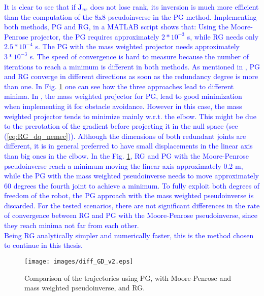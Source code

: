 \textcolor{blue}{It is clear to see that if $\mathbf{J}_{nr}$ does not lose rank, its inversion is much more efficient than the computation of the $\mathrm{8x8}$ pseudoinverse in the PG method. Implementing both methods, PG and RG, in a MATLAB script shows that: Using the Moore-Penrose projector, the PG  requires approximately $2*10^{-3}$ s, while RG  needs only $2.5*10^{-4}$ s. The PG with the mass weighted projector needs approximately $3*10^{-3}$ s. The speed of convergence is hard to measure because the number of iterations to reach a minimum is different in both methods.
As mentioned in \cite{reduced_gradient}, PG and RG converge in different directions as soon as the redundancy degree is more than one. In Fig. \ref{fig:diff_GD_v2} one can see how the three approaches lead to different minima.  In \cite{Nemec_2}, the mass weighted projector for PG, lead to good minimization when implementing it for obstacle avoidance.  
However in this case, the mass weighted projector tends to minimize mainly w.r.t. the elbow. This might be due to the prerotation of the gradient before projecting it in the null space (see (\ref{eq:RG_dq_nemec})). Although the dimensions of both redundant joints are different, it is in general preferred to have small displacements in the linear axis than big ones in the elbow. In the Fig. \ref{fig:diff_GD_v2}, RG and PG with the Moore-Penrose pseudoinverse reach a minimum moving the linear axis approximately 0.2 m, while the PG with the mass weighted pseudoinverse needs to move approximately 60 degrees the fourth joint to achieve a minimum. To fully exploit both degrees of freedom of the robot, the PG approach with the mass weighted pseudoinverse is discarded. 
 For the tested scenarios, there are not significant differences in the rate of convergence between RG and PG with the Moore-Penrose pseudoinverse, since they reach minima not far from each other.  \\ 
Being RG analytically simpler and numerically faster, this is the method chosen to continue in this thesis. }


\begin{figure}[!htb]
	\centerline{
		\texttt{[image: images/diff\_GD\_v2.eps]}}
	\caption{Comparison of the trajectories using PG, with Moore-Penrose and mass weighted pseudoinverse, and RG.}
	\label{fig:diff_GD_v2}
\end{figure}









